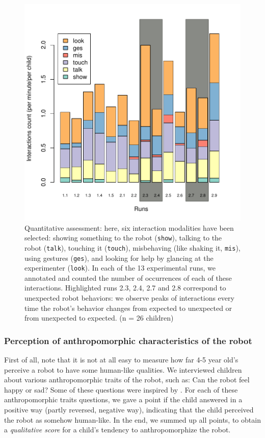 \documentclass{frontiersSCNS} %
\begin{document}
\begin{figure}
    \centering
    \includegraphics[width=0.5\columnwidth]{ranger-interactions-per-runs}
    \caption{Quantitative assessment: here, six interaction modalities have
        been selected: showing something to the robot ({\tt show}), talking to
        the robot ({\tt talk}), touching it ({\tt touch}), misbehaving (like
        shaking it, {\tt mis}), using gestures ({\tt ges}), and looking
        for help by glancing at the experimenter ({\tt look}). In each
        of the 13 experimental runs, we annotated and counted the number of
        occurrences of each of these interactions. Highlighted runs 2.3, 2.4,
        2.7 and 2.8 correspond to unexpected robot behaviors: we observe peaks
        of interactions every time the robot's behavior changes from expected to
        unexpected or from unexpected to expected. (n = 26 children)}

    \label{fig:interactions-per-run}
\end{figure}


\subsubsection{Perception of anthropomorphic characteristics of the robot\\}

First of all, note that it is not at all easy to measure how far 4-5 year old's 
perceive a robot to have some human-like qualities. We interviewed children about 
various anthropomorphic traits of the robot, such as: Can the robot feel happy or 
sad? Some of these questions were inspired by \cite{kahn_jr._robotic_2006}. For 
each of these anthropomorphic traits questions, we gave a point if the child 
answered in a positive way (partly reversed, negative way), indicating that the 
child perceived the robot as somehow human-like. In the end, we summed up all 
points, to obtain a \textit{qualitative score} for a child's tendency to 
anthropomorphize the robot.
\end{document}
